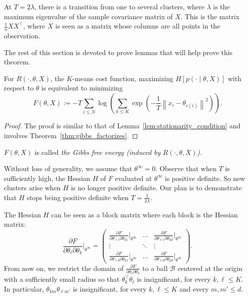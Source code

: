 \begin{theorem}
At $T = 2\lambda$, there is a transition from one to several clusters, where $\lambda$ is the maximum eigenvalue of the sample covariance matrix of $X$. This is the matrix $\frac{1}{n}XX^\top$, where $X$ is seen as a matrix whose columns are all points in the observation.
\label{thm:critical_temp_da}
\end{theorem}

The rest of this section is devoted to prove lemmas that will help prove
this theorem.


\begin{lemma}
For $R(\cdot, \theta, X)$, the $K$-means cost function, maximizing $H[p(\cdot \mid \theta, X)]$ with respect to $\theta$ is equivalent to minimizing
%
\begin{equation}
F(\theta, X) := -T \sum_{i \leq N}\log \left(\sum_{k \leq K}\exp\left(-\frac{1}{T}\left\|x_i - \theta_{c(i)}\right\|^2\right)\right).
\label{eq:gibbs_free_energy_da}
\end{equation}
%
\label{lem:max_ent_is_min_free_energy_da}
\end{lemma}

\begin{proof}
The proof is similar to that of Lemma~\ref{lem:stationarity_condition} and involves Theorem~\ref{thm:gibbs_factorizes}.
\end{proof}

$F\left(\theta, X\right)$ is called \emph{the Gibbs free energy (induced by $R(\cdot, \theta, X)$)}.

Without loss of generality, we assume that $\theta^\infty = 0$. Observe that
when $T$ is sufficiently high, the Hessian $H$ of $F$ evaluated at $\theta^\infty$ is positive
definite. So new clusters arise when $H$ is no longer positive definite. Our plan is to demonstrate that $H$ stops being positive definite when $T = \frac{1}{2\lambda}$.

The Hessian $H$ can be seen as a block matrix where each block is the
Hessian matrix:
%
\begin{equation}
\frac{\partial F}{\partial \theta_\ell \partial \theta_k}\Bigr|_{\theta^\infty} = 
\left(
\begin{array}{ccc}
\displaystyle
\frac{\partial F}{\partial \theta_{\ell 1} \partial \theta_{k 1}}\Bigr|_{\theta^\infty} & \ldots & \displaystyle\frac{\partial F}{\partial \theta_{\ell 1} \partial \theta_{k d}}\Bigr|_{\theta^\infty}\\
\vdots & \ddots & \vdots\\
\displaystyle\frac{\partial F}{\partial \theta_{\ell d} \partial \theta_{k 1}}\Bigr|_{\theta^\infty} & \ldots & \displaystyle\frac{\partial F}{\partial \theta_{\ell d} \partial \theta_{k d}}\Bigr|_{\theta^\infty}
\end{array}
\right).
\end{equation}
%
From now on, we restrict the domain of $\frac{\partial F}{\partial \theta_\ell \partial \theta_k}$ to a ball $\mathcal{B}$ centered at the origin with a sufficiently small radius so that $\theta_k^\top \theta_\ell$ is insignificant, for every $k, \ell \leq K$. In particular, $\theta_{km}\theta_{\ell m'}$ is insignificant, for every $k, \ell \leq K$ and every $m, m' \leq d$.

